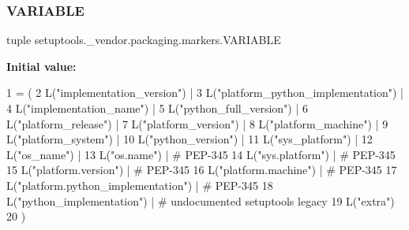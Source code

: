 \mbox{\label{namespacesetuptools_1_1__vendor_1_1packaging_1_1markers_a021c8e62dd311d156adb2106b1225267}} 
\subsubsection{\texorpdfstring{V\+A\+R\+I\+A\+B\+LE}{VARIABLE}}
{\footnotesize\ttfamily tuple setuptools.\+\_\+vendor.\+packaging.\+markers.\+V\+A\+R\+I\+A\+B\+LE}

{\bfseries Initial value\+:}
\begin{DoxyCode}
1 =  (
2     L(\textcolor{stringliteral}{"implementation\_version"}) |
3     L(\textcolor{stringliteral}{"platform\_python\_implementation"}) |
4     L(\textcolor{stringliteral}{"implementation\_name"}) |
5     L(\textcolor{stringliteral}{"python\_full\_version"}) |
6     L(\textcolor{stringliteral}{"platform\_release"}) |
7     L(\textcolor{stringliteral}{"platform\_version"}) |
8     L(\textcolor{stringliteral}{"platform\_machine"}) |
9     L(\textcolor{stringliteral}{"platform\_system"}) |
10     L(\textcolor{stringliteral}{"python\_version"}) |
11     L(\textcolor{stringliteral}{"sys\_platform"}) |
12     L(\textcolor{stringliteral}{"os\_name"}) |
13     L(\textcolor{stringliteral}{"os.name"}) |  \textcolor{comment}{# PEP-345}
14     L(\textcolor{stringliteral}{"sys.platform"}) |  \textcolor{comment}{# PEP-345}
15     L(\textcolor{stringliteral}{"platform.version"}) |  \textcolor{comment}{# PEP-345}
16     L(\textcolor{stringliteral}{"platform.machine"}) |  \textcolor{comment}{# PEP-345}
17     L(\textcolor{stringliteral}{"platform.python\_implementation"}) |  \textcolor{comment}{# PEP-345}
18     L(\textcolor{stringliteral}{"python\_implementation"}) |  \textcolor{comment}{# undocumented setuptools legacy}
19     L(\textcolor{stringliteral}{"extra"})
20 )
\end{DoxyCode}
\mbox{\label{namespacesetuptools_1_1__vendor_1_1packaging_1_1markers_a749acffb82482133fbe0d13f0e4c1a84}} 
